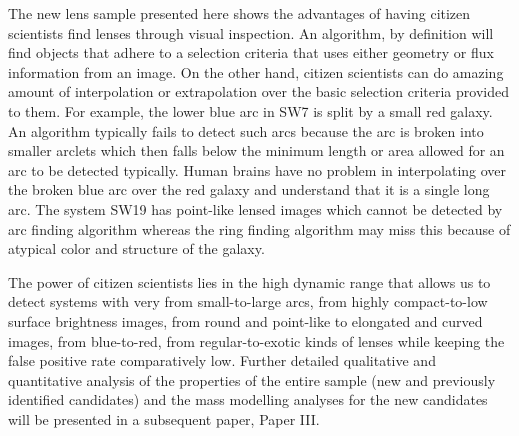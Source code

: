 \documentclass[useAMS,usenatbib,a4paper]{mn2e}
\begin{document}
The new \sw lens sample presented here shows the advantages of having
citizen scientists find lenses through visual inspection. An algorithm,
by definition will find objects that adhere to a selection criteria that
uses either geometry or flux information from an image. On the other
hand, citizen scientists can do amazing amount of interpolation or
extrapolation over the basic selection criteria provided to them. 
For example,  the lower blue arc in SW7 is split by a small red galaxy.
An algorithm typically fails to detect such arcs because the arc is
broken into smaller arclets which then falls below the minimum length or
area allowed for an arc to be detected typically. Human brains have no
problem in interpolating over the broken blue arc over the red galaxy
and understand that it is a single long arc. The system SW19 has
point-like lensed images which cannot be detected by arc finding
algorithm whereas the ring finding algorithm may miss this because of
atypical color and structure of the galaxy. 

The power of citizen scientists lies in the high dynamic range that
allows us to detect systems with very from small-to-large arcs, from
highly compact-to-low surface brightness images, from round and
point-like to elongated and curved images, from blue-to-red, from
regular-to-exotic kinds of lenses while keeping the false positive rate
comparatively low. Further detailed qualitative and quantitative
analysis of the properties of the entire \sw sample (new and previously
identified candidates) and the mass modelling analyses for the new
candidates will be presented in a subsequent \sw paper, Paper III.





\end{document}

